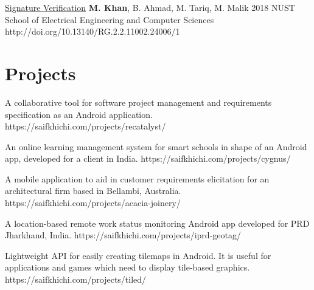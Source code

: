 \documentclass[%
              doublesided,
              paper=a4,
              fontsize=10pt
              ]{my-resume}
\begin{document}
{     \publication
    	{\href{https://saifkhichi.com/research/signature-verification/}{Signature Verification}} %
    	{\textbf{M. Khan}, B. Ahmad, M. Tariq, M. Malik} %
    	{2018} %
    	{NUST School of Electrical Engineering and Computer Sciences} %
    	{http://doi.org/10.13140/RG.2.2.11002.24006/1} %

    \section{Projects}
    {A collaborative tool for software project management and requirements specification as an Android application.}
    {https://saifkhichi.com/projects/recatalyst/}

    {An online learning management system for smart schools in shape of an Android app, developed for a client in India.}
    {https://saifkhichi.com/projects/cygnus/}
    
    {A mobile application to aid in customer requirements elicitation for an architectural firm based in Bellambi, Australia.}
    {https://saifkhichi.com/projects/acacia-joinery/}
    
    {A location-based remote work status monitoring Android app developed for PRD Jharkhand, India.}
    {https://saifkhichi.com/projects/iprd-geotag/}
    
    {Lightweight API for easily creating tilemaps in Android. It is useful for applications and games which need to display tile-based graphics.}
    {https://saifkhichi.com/projects/tiled/}
    
}
\makebody
\end{document}
